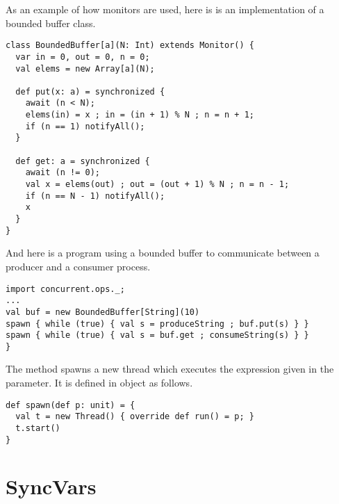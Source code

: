 \documentclass[a4paper,12pt,twoside,titlepage]{book}
\begin{document}
{As an example of how monitors are used, here is is an implementation
of a bounded buffer class.
\begin{lstlisting}
class BoundedBuffer[a](N: Int) extends Monitor() {
  var in = 0, out = 0, n = 0;
  val elems = new Array[a](N);

  def put(x: a) = synchronized {
    await (n < N);
    elems(in) = x ; in = (in + 1) % N ; n = n + 1;
    if (n == 1) notifyAll();
  }

  def get: a = synchronized {
    await (n != 0);
    val x = elems(out) ; out = (out + 1) % N ; n = n - 1;
    if (n == N - 1) notifyAll();
    x
  }
}
\end{lstlisting}
And here is a program using a bounded buffer to communicate between a
producer and a consumer process.
\begin{lstlisting}
import concurrent.ops._;
...
val buf = new BoundedBuffer[String](10)
spawn { while (true) { val s = produceString ; buf.put(s) } }
spawn { while (true) { val s = buf.get ; consumeString(s) } }
}
\end{lstlisting}
The  method spawns a new thread which executes the
expression given in the parameter. It is defined in object 
as follows.
\begin{lstlisting}
def spawn(def p: unit) = {
  val t = new Thread() { override def run() = p; }
  t.start()
}
\end{lstlisting}


\section{SyncVars}

}
\end{document}
